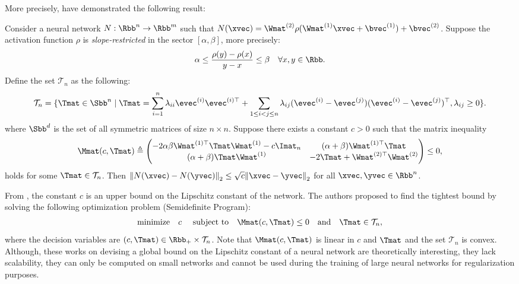 More precisely, \citet{fazlyab2019efficient} have demonstrated the following result:
\begin{theorem} \label{theorem:ch3-lipschite_semidefinite_programming}
  Consider a neural network $N: \Rbb^n \rightarrow \Rbb^m$ such that $N(\xvec) = \Wmat^{(2)} \rho(\Wmat^{(1)} \xvec + \bvec^{(1)}) + \bvec^{(2)}$.
  Suppose the activation function $\rho$ is \emph{slope-restricted} in the sector $[\alpha,\beta]$, more precisely:
  \begin{equation}
    \alpha \leq \frac{\rho(y) - \rho(x)}{y-x} \leq \beta \quad \forall x,y \in \Rbb. 
  \end{equation}
  Define the set $\mathcal{T}_{n}$ as the following:
  \begin{equation*}
    \mathcal{T}_n = \{\Tmat \in \Sbb^n \mid \Tmat = \sum_{i=1}^{n} \lambda_{ii} \evec^{(i)} \evec^{(i)\top} + \sum_{1 \leq i<j \leq n} \lambda_{ij}(\evec^{(i)} - \evec^{(j)})(\evec^{(i)}-\evec^{(j)})^\top, \lambda_{ij} \geq 0 \}.
  \end{equation*}
  where $\Sbb^d$ is the set of all symmetric matrices of size $n \times n$.
  Suppose there exists a constant $c>0$ such that the matrix inequality
  \begin{align}
    \Mmat(c,\Tmat) \triangleq
      \leftmatrix
      -2\alpha \beta \Wmat^{(1)\top} \Tmat \Wmat^{(1)} - c \Imat_n & (\alpha+\beta) \Wmat^{(1)\top} \Tmat  \\
      (\alpha+\beta) \Tmat \Wmat^{(1)} & -2\Tmat+\Wmat^{(2)\top} \Wmat^{(2)}
      \rightmatrix
      \leq 0,
  \end{align}
  holds for some $\Tmat \in \mathcal{T}_{n}$. Then $\norm{N(\xvec)-N(\yvec)}_2 \leq \sqrt{c} \norm{\xvec-\yvec}_2$ for all  $\xvec,\yvec \in \Rbb^n$.
\end{theorem}
\noindent
From , the constant $c$ is an upper bound on the Lipschitz constant of the network.
The authors proposed to find the tightest bound by solving the following optimization problem (Semidefinite Program):
\begin{align}
  \textrm{minimize} \quad c \quad \text{ subject to} \quad \Mmat(c,\Tmat) \leq 0 \quad \text{and} \quad \Tmat \in \mathcal{T}_{n},
\end{align}
where the decision variables are $(c,\Tmat) \in \Rbb_+ \times \mathcal{T}_n$.
Note that $\Mmat(c,\Tmat)$ is linear in $c$ and $\Tmat$ and the set $\mathcal{T}_n$ is convex.
Although, these works on devising a global bound on the Lipschitz constant of a neural network are theoretically interesting, they lack scalability, they can only be computed on small networks and cannot be used during the training of large neural networks for regularization purposes.


